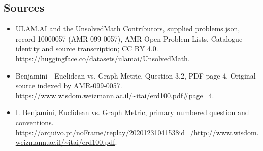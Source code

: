 \documentclass[11pt,a4paper]{article}
\begin{document}
\subsection{Sources}
\begin{itemize}
\item[S1] ULAM.AI and the UnsolvedMath Contributors, supplied problems.json, record 10000057 (AMR-099-0057), AMR Open Problem Lists. Catalogue identity and source transcription; CC BY 4.0.
\url{https://huggingface.co/datasets/ulamai/UnsolvedMath}.
\item[S2] Benjamini - Euclidean vs. Graph Metric, Question 3.2, PDF page 4. Original source indexed by AMR-099-0057.
\url{https://www.wisdom.weizmann.ac.il/~itai/erd100.pdf#page=4}.
\item[S3] I. Benjamini, Euclidean vs. Graph Metric, primary numbered question and conventions.
\url{https://arquivo.pt/noFrame/replay/20201231041538id_/http://www.wisdom.weizmann.ac.il/~itai/erd100.pdf}.
\end{itemize}
\end{document}
